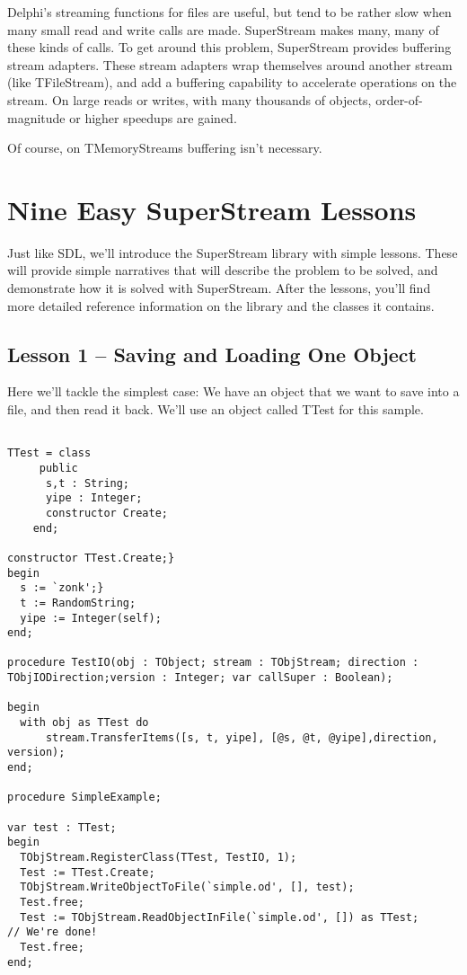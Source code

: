 \documentclass{report}
\begin{document}
Delphi's streaming functions for files are useful, but tend to be rather
slow when many small read and write calls are made. SuperStream makes many,
many of these kinds of calls. To get around this problem, SuperStream
provides buffering stream adapters. These stream adapters wrap themselves
around another stream (like TFileStream), and add a buffering capability to
accelerate operations on the stream.  On large reads or writes, with many
thousands of objects, order-of-magnitude or higher speedups are gained.

Of course, on TMemoryStreams buffering isn't necessary.

\section{Nine Easy SuperStream Lessons}

Just like SDL, we'll introduce the SuperStream library with simple lessons.
These will provide simple narratives that will describe the problem to be
solved, and demonstrate how it is solved with SuperStream. After the
lessons, you'll find more detailed reference information on the library and
the classes it contains.

\subsection{Lesson 1 -- Saving and Loading One Object}

Here we'll tackle the simplest case: We have an object that we want to save
into a file, and then read it back. We'll use an object called TTest for
this sample.

\begin{lstlisting}

TTest = class
  	 public
 	  s,t : String;
	  yipe : Integer;
	  constructor Create;
	end;

constructor TTest.Create;}
begin
  s := `zonk';}
  t := RandomString;
  yipe := Integer(self);
end;

procedure TestIO(obj : TObject; stream : TObjStream; direction : TObjIODirection;version : Integer; var callSuper : Boolean);

begin
  with obj as TTest do 
      stream.TransferItems([s, t, yipe], [@s, @t, @yipe],direction, version);
end;

procedure SimpleExample;

var test : TTest;
begin
  TObjStream.RegisterClass(TTest, TestIO, 1);
  Test := TTest.Create;
  TObjStream.WriteObjectToFile(`simple.od', [], test);
  Test.free;
  Test := TObjStream.ReadObjectInFile(`simple.od', []) as TTest;
// We're done!
  Test.free;
end;
\end{lstlisting}
\end{document}
